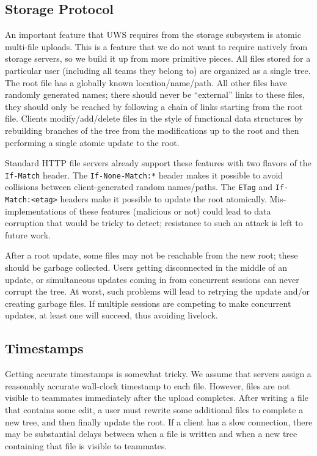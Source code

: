 \documentclass[runningheads]{llncs}
\begin{document}
\subsection{Storage Protocol}

An important feature that UWS requires from the storage subsystem is atomic multi-file uploads.
This is a feature that we do not want to require natively from storage servers, so we build it up from more primitive pieces.
All files stored for a particular user (including all teams they belong to) are organized as a single tree.
The root file has a globally known location{\slash}name{\slash}path.
All other files have randomly generated names; there should never be ``external'' links to these files, they should only be reached by following a chain of links starting from the root file.
Clients modify{\slash}add{\slash}delete files in the style of functional data structures by rebuilding branches of the tree from the modifications up to the root and then performing a single atomic update to the root.

Standard HTTP file servers already support these features with two flavors of the \texttt{If-Match} header.
The \texttt{If-None-Match:*} header makes it possible to avoid collisions between client-generated random names{\slash}paths.
The \texttt{ETag} and \texttt{If-Match:<etag>} headers make it possible to update the root atomically.
Mis-implementations of these features (malicious or not) could lead to data corruption that would be tricky to detect; resistance to such an attack is left to future work.

After a root update, some files may not be reachable from the new root; these should be garbage collected.
Users getting disconnected in the middle of an update, or simultaneous updates coming in from concurrent sessions can never corrupt the tree.
At worst, such problems will lead to retrying the update and{\slash}or creating garbage files.
If multiple sessions are competing to make concurrent updates, at least one will succeed, thus avoiding livelock.

\subsection{Timestamps}

Getting accurate timestamps is somewhat tricky.
We assume that servers assign a reasonably accurate wall-clock timestamp to each file.
However, files are not visible to teammates immediately after the upload completes.
After writing a file that contains some edit, a user must rewrite some additional files to complete a new tree, and then finally update the root.
If a client has a slow connection, there may be substantial delays between when a file is written and when a new tree containing that file is visible to teammates.
\end{document}

